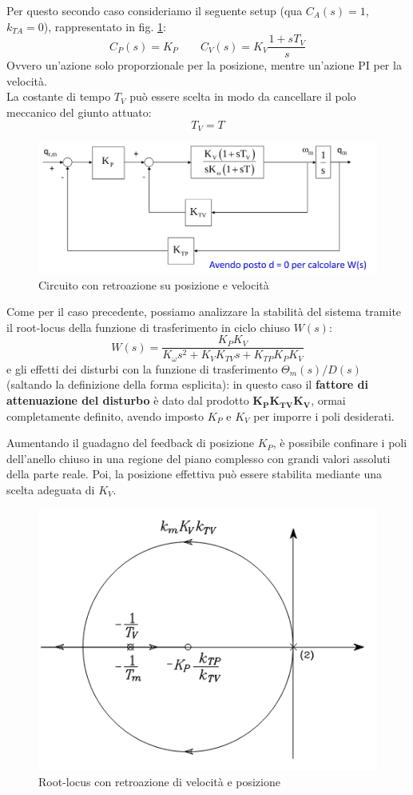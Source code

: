 Per questo secondo caso consideriamo il seguente setup (qua $C_A(s)=1$, $k_{TA}=0$), rappresentato in fig. \ref{fig:decentralizedjointspacecontrol7}:
$$
C_P(s) = K_P \qquad C_V(s)=K_V\frac{1+sT_V}{s}
$$
Ovvero un'azione solo proporzionale per la posizione, mentre un'azione PI per la velocità. \\
La costante di tempo $T_V$ può essere scelta in modo da cancellare il polo meccanico del giunto attuato: 
$$
T_V = T
$$

\begin{figure}[ht!]
	\centering
	\includegraphics[width=0.7\linewidth]{images/decentralized_joint_space_control_7}
	\caption{Circuito con retroazione su posizione e velocità}
	\label{fig:decentralizedjointspacecontrol7}
\end{figure}

Come per il caso precedente, possiamo analizzare la stabilità del sistema tramite il root-locus della funzione di trasferimento in ciclo chiuso $W(s)$:
$$
W(s)=\frac{K_P K_V}{K_\omega s^2 + K_V K_{TV} s + K_{TP} K_P K_V}
$$
e gli effetti dei disturbi con la funzione di trasferimento $\Theta_m(s)/D(s)$ (saltando la definizione della forma esplicita): in questo caso il \textbf{fattore di attenuazione del disturbo} è dato dal prodotto $\mathbf{K_P K_{TV} K_V}$, ormai completamente definito, avendo imposto $K_P$ e $K_V$ per imporre i poli desiderati.

Aumentando il guadagno del feedback di posizione $K_P$, è possibile confinare i poli dell'anello chiuso in una regione del piano complesso con grandi valori assoluti della parte reale. Poi, la posizione effettiva può essere stabilita mediante una scelta adeguata di $K_V$.

\begin{figure}[!ht]
	\centering
	\includegraphics[width=0.5\linewidth]{images/root_locus_2}
	\caption{Root-locus con retroazione di velocità e posizione}
	\label{fig:rootlocus2}
\end{figure}







